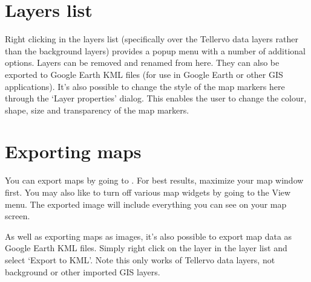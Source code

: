 \section{Layers list}

Right clicking in the layers list (specifically over the Tellervo data layers rather than the background layers) provides a popup menu with a number of additional options.  Layers can be removed and renamed from here.  They can also be exported to Google Earth KML files (for use in Google Earth or other GIS applications).  It's also possible to change the style of the map markers here through the `Layer properties' dialog.  This enables the user to change the colour, shape, size and transparency of the map markers.







\section{Exporting maps}

\label{txt:exportmap}
You can export maps by going to . For best results, maximize your map window first. You may also like to turn off various map widgets by going to the View menu. The exported image will include everything you can see on your map screen. 

As well as exporting maps as images, it's also possible to export map data as Google Earth KML files.  Simply right click on the layer in the layer list and select `Export to KML'.  Note this only works of Tellervo data layers, not background or other imported GIS layers.


